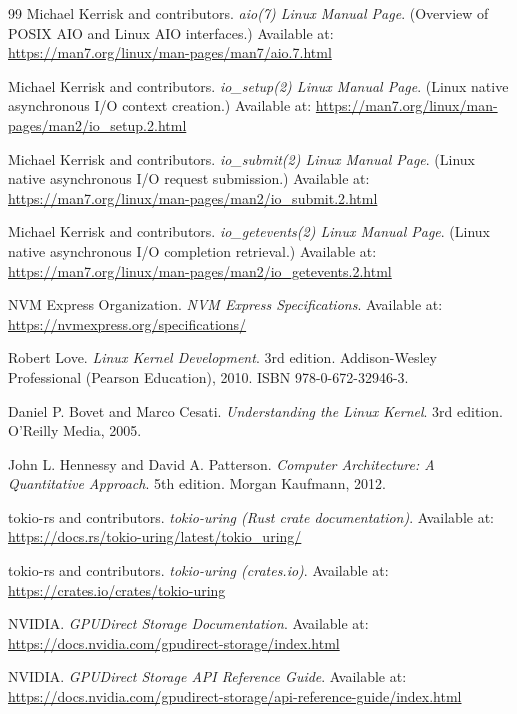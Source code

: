 \documentclass[]{final_report}
\begin{document}
\begin{thebibliography}{99}
Michael Kerrisk and contributors.
\emph{aio(7) Linux Manual Page}.
(Overview of POSIX AIO and Linux AIO interfaces.)
Available at: \url{https://man7.org/linux/man-pages/man7/aio.7.html}

Michael Kerrisk and contributors.
\emph{io\_setup(2) Linux Manual Page}.
(Linux native asynchronous I/O context creation.)
Available at: \url{https://man7.org/linux/man-pages/man2/io_setup.2.html}

Michael Kerrisk and contributors.
\emph{io\_submit(2) Linux Manual Page}.
(Linux native asynchronous I/O request submission.)
Available at: \url{https://man7.org/linux/man-pages/man2/io_submit.2.html}

Michael Kerrisk and contributors.
\emph{io\_getevents(2) Linux Manual Page}.
(Linux native asynchronous I/O completion retrieval.)
Available at: \url{https://man7.org/linux/man-pages/man2/io_getevents.2.html}

NVM Express Organization.
\emph{NVM Express Specifications}.
Available at: \url{https://nvmexpress.org/specifications/}

Robert Love.
\emph{Linux Kernel Development}.
3rd edition.
Addison-Wesley Professional (Pearson Education), 2010.
ISBN 978-0-672-32946-3.

Daniel P. Bovet and Marco Cesati.
\emph{Understanding the Linux Kernel}.
3rd edition.
O'Reilly Media, 2005.

John L. Hennessy and David A. Patterson.
\emph{Computer Architecture: A Quantitative Approach}.
5th edition.
Morgan Kaufmann, 2012.

tokio-rs and contributors.
\emph{tokio-uring (Rust crate documentation)}.
Available at: \url{https://docs.rs/tokio-uring/latest/tokio_uring/}

tokio-rs and contributors.
\emph{tokio-uring (crates.io)}.
Available at: \url{https://crates.io/crates/tokio-uring}

NVIDIA.
\emph{GPUDirect Storage Documentation}.
Available at: \url{https://docs.nvidia.com/gpudirect-storage/index.html}

NVIDIA.
\emph{GPUDirect Storage API Reference Guide}.
Available at: \url{https://docs.nvidia.com/gpudirect-storage/api-reference-guide/index.html}

\end{thebibliography}
\end{document}
